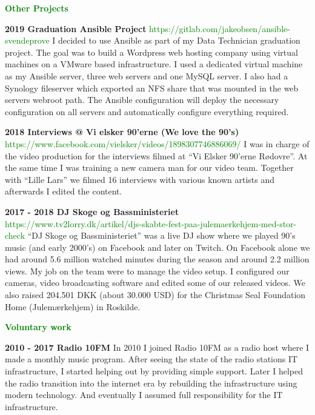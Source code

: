 \documentclass[11pt]{article}
\begin{document}
\textcolor{green}{{\fontsize{13}{16}\textbf{{Other Projects}}}}\newline

\textbf{2019      Graduation Ansible Project}\newline
\textcolor{green}{https://gitlab.com/jakeobsen/ansible-svendeprove}\newline
I decided to use Ansible as part of my Data Technician graduation project.  The goal was to build a Wordpress
web hosting company using virtual machines on a VMware based infrastructure. I used  a dedicated virtual machine
as my Ansible server, three web servers and one MySQL server. I also had a Synology fileserver which exported an
NFS share that was mounted in the web servers webroot path. The Ansible configuration will deploy the necessary
configuration on all servers and automatically configure everything required.\newline

\textbf{2018      Interviews @ Vi elsker 90'erne (We love the 90’s)}\newline
\textcolor{green}{https://www.facebook.com/vielsker/videos/1898307746886069/}\newline
I was in charge of the video production for the interviews filmed at “Vi Elsker 90'erne Rødovre”. At the same
time I was training a new camera man for our video team. Together with “Lille Lars” we filmed 16 interviews with
various known artists and afterwards I edited the content.\newline

\textbf{2017 - 2018   DJ Skoge og Bassministeriet}\newline
\textcolor{green}{https://www.tv2lorry.dk/artikel/djs-skabte-fest-paa-julemaerkehjem-med-stor-check}\newline
“DJ Skoge og Bassministeriet” was a live DJ show where we played 90's music (and early 2000's) on Facebook and
later on Twitch. On Facebook alone we had around 5.6 million watched minutes during the season and around 2.2
million views. My job on the team were to manage the video setup. I configured our cameras, video broadcasting
software and edited some of our released videos. We also raised 204.501 DKK (about 30.000 USD) for the Christmas
Seal Foundation Home (Julemærkehjem) in Roskilde.\newline

\textcolor{green}{{\fontsize{13}{16}\textbf{{Voluntary work}}}}\newline

\textbf{2010 - 2017   Radio 10FM}\newline
In 2010 I joined Radio 10FM as a radio host where I made a monthly music program. After seeing the state of the
radio stations IT infrastructure, I started helping out by providing simple support. Later I helped the radio
transition into the internet era by rebuilding the infrastructure using modern technology. And eventually I
assumed full responsibility for the IT infrastructure.\newline
\end{document}
